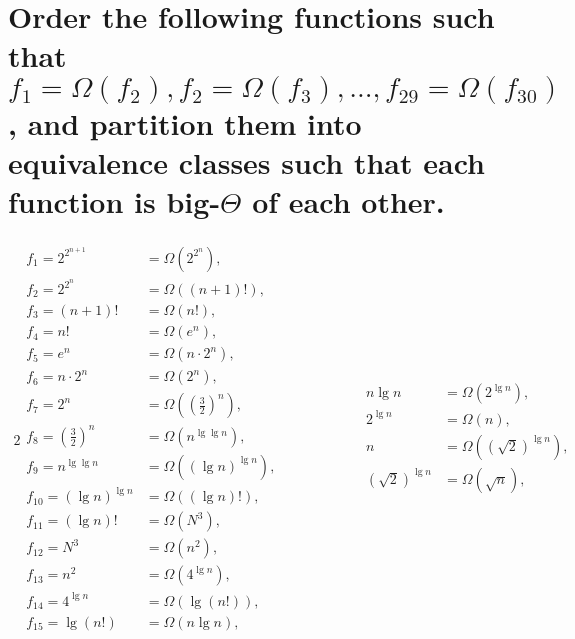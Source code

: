 \section[Problem 6]{Order the following functions such that $f_1 = \Omega(f_2), f_2 = \Omega(f_3), ..., f_{29} = \Omega(f_{30})$, and partition them into equivalence classes such that each function is big-$\Theta$ of each other.}

\begin{alignat*}{2}
	\begin{aligned}
		f_1 = 2^{2^{n + 1}} &= \Omega \left(2^{2^n} \right), \\
		f_2 = 2^{2^n} &= \Omega \left((n + 1)! \right), \\
		f_3 = (n + 1)! &= \Omega \left(n! \right), \\
		f_4 = n! &= \Omega \left(e^n \right), \\
		f_5 = e^n &= \Omega \left(n \cdot 2^n \right), \\
		f_6 = n \cdot 2^n &= \Omega \left(2^n \right), \\
		f_7 = 2^n &= \Omega \left(\left( \frac{3}{2} \right)^n \right), \\
		f_8 = \left( \frac{3}{2} \right)^n &= \Omega \left(n^{\lg \lg n} \right), \\
		f_9 = n^{\lg \lg n} &= \Omega \left(\left( \lg n \right)^{\lg n} \right), \\
		f_10 = \left( \lg n \right)^{\lg n} &= \Omega \left((\lg n)! \right), \\
		f_11 = (\lg n)! &= \Omega \left(N^3 \right), \\
		f_12 = N^3 &= \Omega \left(n^2 \right), \\
		f_13 = n^2 &= \Omega \left(4^{\lg n} \right), \\
		f_14 = 4^{\lg n} &= \Omega \left(\lg (n!) \right), \\
		f_15 = \lg (n!)  &= \Omega \left(n \lg n \right), \\
	\end{aligned}
	& \qquad \qquad &
	\begin{aligned}
		n \lg n &= \Omega \left(2^{\lg n} \right), \\
		2^{\lg n} &= \Omega \left(n \right), \\
		n &= \Omega \left(\left( \sqrt{2} \right)^{\lg n} \right), \\
		\left( \sqrt{2} \right)^{\lg n} &= \Omega \left(\sqrt{n} \right), \\

\end{aligned}
\end{alignat*}
